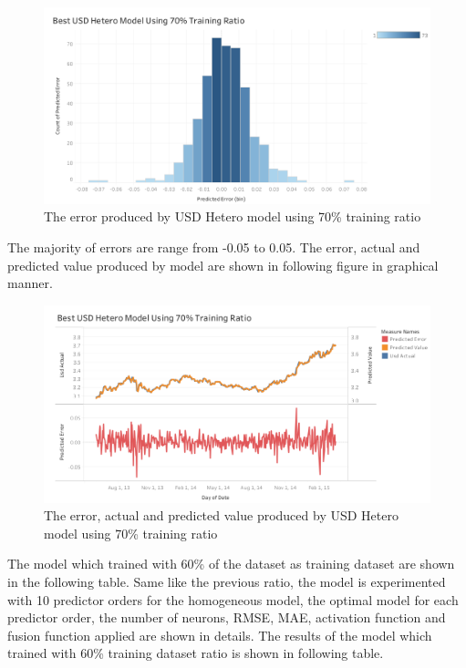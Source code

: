 {{{{{{		\begin{figure}[hbt!]\centering
			\includegraphics[width=1\textwidth]{hetero_usd_70}
			\caption{The error produced by USD Hetero model  using 70\% training ratio}
		\end{figure}
		\pagebreak
		The majority of errors are range from -0.05 to 0.05. The error, actual and predicted value produced by model are shown in following figure in graphical manner.  
		\begin{figure}[hbt!]\centering
			\includegraphics[width=1\textwidth]{best_usd_hetero_APV_70}
			\caption{The error, actual and predicted value produced by USD Hetero model using 70\% training ratio }
		\end{figure}
		\pagebreak
		
		
		The model which trained with 60\% of the dataset as training dataset are shown in the following table. Same like the previous ratio, the model is  experimented with 10 predictor orders for the homogeneous model, the optimal model for each predictor order, the number of neurons, RMSE, MAE, activation function and fusion function applied are shown in details. The results of the model which trained with 60\% training dataset ratio is shown in following table.
		\\
		
}}}}}}
